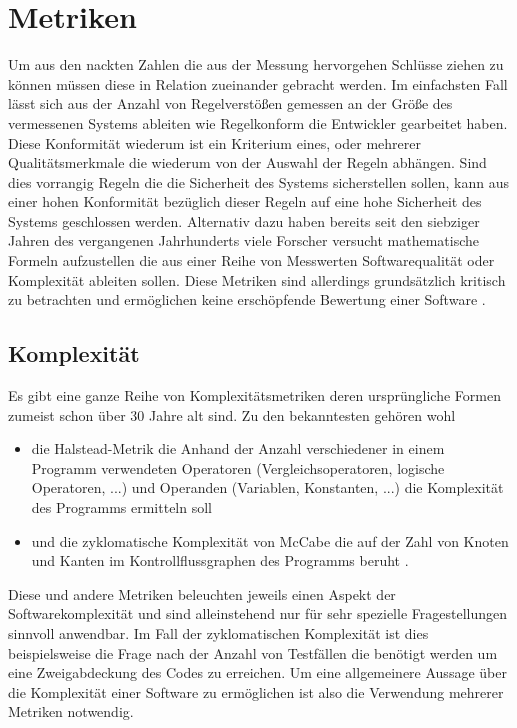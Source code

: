 \documentclass[gb,ngerman]{stthesis}
\begin{document}
     \section{Metriken}
     	Um aus den nackten Zahlen die aus der Messung hervorgehen Schlüsse ziehen zu können müssen diese in Relation zueinander gebracht werden. Im einfachsten Fall lässt sich aus der Anzahl von Regelverstößen gemessen an der Größe des vermessenen Systems ableiten wie Regelkonform die Entwickler gearbeitet haben. Diese Konformität wiederum ist ein Kriterium eines, oder mehrerer Qualitätsmerkmale die wiederum von der Auswahl der Regeln abhängen. Sind dies vorrangig Regeln die die Sicherheit des Systems sicherstellen sollen, kann aus einer hohen Konformität bezüglich dieser Regeln auf eine hohe Sicherheit des Systems geschlossen werden. Alternativ dazu haben bereits seit den siebziger Jahren des vergangenen Jahrhunderts viele Forscher versucht mathematische Formeln aufzustellen die aus einer Reihe von Messwerten Softwarequalität oder Komplexität ableiten sollen. Diese Metriken sind allerdings grundsätzlich kritisch zu betrachten und ermöglichen keine erschöpfende Bewertung einer Software \cite{SoftwareComplexityMeasurement}.
     	\subsection{Komplexität}
     		Es gibt eine ganze Reihe von Komplexitätsmetriken deren ursprüngliche Formen zumeist schon über 30 Jahre alt sind. Zu den bekanntesten gehören wohl 
     		\begin{itemize}
     			\item die Halstead-Metrik die Anhand der Anzahl verschiedener in einem Programm verwendeten Operatoren (Vergleichsoperatoren, logische Operatoren, ...) und Operanden (Variablen, Konstanten, ...) die Komplexität des Programms ermitteln soll \cite{SoftwareScience} 
     			\item und die zyklomatische Komplexität von McCabe die auf der Zahl von Knoten und Kanten im Kontrollflussgraphen des Programms beruht \cite{AComplexityMeasure}.
     		\end{itemize}
     		Diese und andere Metriken beleuchten jeweils einen Aspekt der Softwarekomplexität und sind alleinstehend nur für sehr spezielle Fragestellungen sinnvoll anwendbar. Im Fall der zyklomatischen Komplexität ist dies beispielsweise die Frage nach der Anzahl von Testfällen die benötigt werden um eine Zweigabdeckung des Codes zu erreichen. Um eine allgemeinere Aussage über die Komplexität einer Software zu ermöglichen ist also die Verwendung mehrerer Metriken notwendig.
\end{document}
